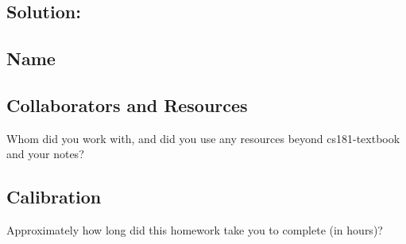 \documentclass[submit]{harvardml}
\begin{document}
\newpage

\subsection*{Solution:}

\newpage
\subsection*{Name}

\subsection*{Collaborators and Resources}
Whom did you work with, and did you use any resources beyond cs181-textbook and your notes?

\subsection*{Calibration}
Approximately how long did this homework take you to complete (in hours)? 
\end{document}
